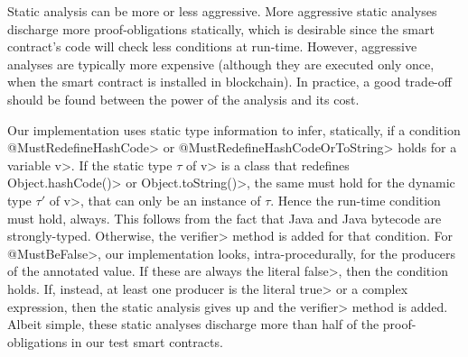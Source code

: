 Static analysis can be more or less aggressive.
More aggressive static analyses discharge more proof-obligations statically,
which is desirable since the smart contract's code will check less
conditions at run-time. However, aggressive analyses are typically more expensive
(although they are executed only once, when the smart contract is installed in
blockchain). In practice, a good trade-off should be found between the power of the analysis
and its cost.

Our implementation uses static type information to infer, statically, if a condition
\<@MustRedefineHashCode> or \<@MustRedefineHashCodeOrToString> holds for a variable \<v>.
If the static type
$\tau$ of \<v> is a class that redefines \<Object.hashCode()> or \<Object.toString()>,
the same must hold for the dynamic type $\tau'$ of \<v>, that can only be an
instance of $\tau$. Hence the run-time condition must hold, always.
This follows from the fact that Java and Java bytecode
are strongly-typed. Otherwise, the \<verifier> method is added for that condition.
For \<@MustBeFalse>, our implementation looks, intra-procedurally, for
the producers of the annotated value.
If these are always the literal \<false>, then the condition holds.
If, instead, at least one producer is the literal \<true> or a complex expression,
then the static analysis gives up and the \<verifier> method is added.
Albeit simple, these static analyses discharge more than half of the proof-obligations
in our test smart contracts.
